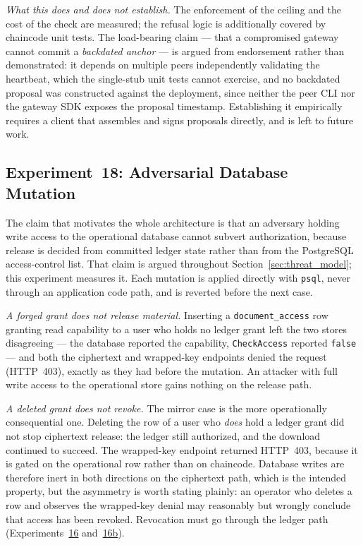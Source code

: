 \documentclass[preprint,12pt]{elsarticle}
\begin{document}
\emph{What this does and does not establish.} The enforcement of the ceiling and
the cost of the check are measured; the refusal logic is additionally covered by
chaincode unit tests. The load-bearing claim --- that a compromised gateway
cannot commit a \emph{backdated anchor} --- is argued from endorsement rather than
demonstrated: it depends on multiple peers independently validating the
heartbeat, which the single-stub unit tests cannot exercise, and no backdated
proposal was constructed against the deployment, since neither the peer CLI nor
the gateway SDK exposes the proposal timestamp. Establishing it empirically
requires a client that assembles and signs proposals directly, and is left to
future work.

\subsection{Experiment~18: Adversarial Database Mutation}
\label{sec:exp_db_mutation}

The claim that motivates the whole architecture is that an adversary holding write
access to the operational database cannot subvert authorization, because release is
decided from committed ledger state rather than from the PostgreSQL access-control
list. That claim is argued throughout Section~\ref{sec:threat_model}; this experiment
measures it. Each mutation is applied directly with \texttt{psql}, never through an
application code path, and is reverted before the next case.

\emph{A forged grant does not release material.} Inserting a
\texttt{document\_access} row granting read capability to a user who holds no
ledger grant left the two stores disagreeing --- the database reported the
capability, \texttt{CheckAccess} reported \texttt{false} --- and both the ciphertext
and wrapped-key endpoints denied the request (HTTP~403), exactly as they had before
the mutation. An attacker with full write access to the operational store gains
nothing on the release path.

\emph{A deleted grant does not revoke.} The mirror case is the more operationally
consequential one. Deleting the row of a user who \emph{does} hold a ledger grant did
not stop ciphertext release: the ledger still authorized, and the download continued
to succeed. The wrapped-key endpoint returned HTTP~403, because it is gated on the
operational row rather than on chaincode. Database writes are therefore inert in both
directions on the ciphertext path, which is the intended property, but the asymmetry
is worth stating plainly: an operator who deletes a row and observes the wrapped-key
denial may reasonably but wrongly conclude that access has been revoked. Revocation
must go through the ledger path
(Experiments~\hyperref[sec:exp_orderer_outage]{16} and~\hyperref[sec:exp_orderer_reconcile]{16b}).
\end{document}
